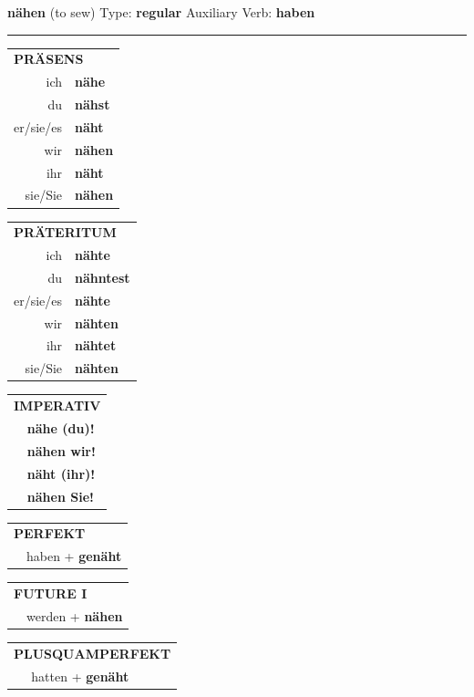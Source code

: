 \documentclass[10pt,a4paper]{revtex4-2}
\begin{document}
\begin{verbbox}
{\Large \bf nähen} (to sew) \hfill Type: \textbf{regular} \hfill Auxiliary Verb: \textbf{haben}

\vspace{5pt}
\hrule
\vspace{5pt}

\begin{tabular}{rl}
\multicolumn{2}{l}{\textbf{PRÄSENS}}\\
ich & \textbf{nähe}\\
du & \textbf{nähst}\\
er/sie/es & \textbf{näht}\\
wir & \textbf{nähen}\\
ihr & \textbf{näht}\\
sie/Sie & \textbf{nähen}\\
\end{tabular}
\hfill
\begin{tabular}{rl}
\multicolumn{2}{l}{\textbf{PRÄTERITUM}}\\
ich & \textbf{nähte}\\
du & \textbf{nähntest}\\
er/sie/es & \textbf{nähte}\\
wir & \textbf{nähten}\\
ihr & \textbf{nähtet}\\
sie/Sie & \textbf{nähten}\\
\end{tabular}
\hfill
\begin{tabular}{rl}
\multicolumn{2}{l}{\textbf{IMPERATIV}}\\
& \textbf{nähe (du)!}\\
& \textbf{nähen wir!}\\
& \textbf{näht (ihr)!}\\
& \textbf{nähen Sie!}\\
\end{tabular}

\vspace{10pt}

\begin{tabular}{rl}
\multicolumn{2}{l}{\textbf{PERFEKT}}\\
& haben + \textbf{genäht}\\
\end{tabular}
\hfill
\begin{tabular}{rl}
\multicolumn{2}{l}{\textbf{FUTURE I}}\\
& werden + \textbf{nähen}\\
\end{tabular}
\hfill
\begin{tabular}{rl}
\multicolumn{2}{l}{\textbf{PLUSQUAMPERFEKT}}\\
& hatten + \textbf{genäht}\\
\end{tabular}


\end{verbbox}
\end{document}
